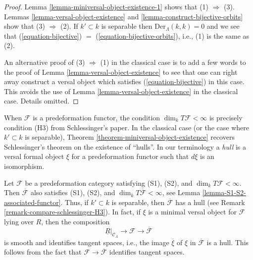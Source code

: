 \begin{proof}
Lemma \ref{lemma-miniversal-object-existence-1}
shows that (1) $\Rightarrow$ (3).
Lemmas \ref{lemma-versal-object-existence} and
\ref{lemma-construct-bijective-orbits}
show that (3) $\Rightarrow$ (2). If $k' \subset k$ is separable
then $\text{Der}_\Lambda(k, k) = 0$ and we see that
(\ref{equation-bijective}) $=$ (\ref{equation-bijective-orbits}), i.e.,
(1) is the same as (2).

\medskip\noindent
An alternative proof of (3) $\Rightarrow$ (1) in the classical case
is to add a few words to the proof of
Lemma \ref{lemma-versal-object-existence}
to see that one can right away construct a versal object which
satisfies (\ref{equation-bijective}) in this case. This avoids the use of
Lemma \ref{lemma-versal-object-existence}
in the classical case. Details omitted.
\end{proof}

\begin{remark}
\label{remark-compare-schlessinger-H3}
When $\mathcal{F}$ is a predeformation functor, the condition
$\dim_k T\mathcal{F} < \infty$ is precisely condition (H3) from
Schlessinger's paper. In the classical case (or the case where
$k' \subset k$ is separable),
Theorem \ref{theorem-miniversal-object-existence}
recovers Schlessinger's theorem on the existence of ``hulls''.
In our terminology a {\it hull} is a versal formal object $\xi$ for a
predeformation functor such that $d\xi$ is an isomorphism.
\end{remark}

\begin{remark}
\label{remark-compose-minimal-into-iso-classes}
Let $\mathcal{F}$ be a predeformation category satisfying
(S1), (S2), and $\dim_k T\mathcal{F} < \infty$.
Then $\overline{\mathcal{F}}$ also satisfies
(S1), (S2), and $\dim_k T\overline{\mathcal{F}} < \infty$, see
Lemma \ref{lemma-S1-S2-associated-functor}.
Thus, if $k' \subset k$ is separable, then $\overline{\mathcal{F}}$
has a hull (see Remark \ref{remark-compare-schlessinger-H3}).
In fact, if $\xi$ is a minimal versal object for $\mathcal{F}$
lying over $R$, then the composition
$$
\underline{R}|_{\mathcal{C}_\Lambda} \longrightarrow
\mathcal{F} \longrightarrow \overline{\mathcal{F}}
$$
is smooth and identifies tangent spaces, i.e., the image $\overline{\xi}$
of $\xi$ in $\overline{\mathcal{F}}$ is a hull. This follows from the fact that
$\mathcal{F} \to \overline{\mathcal{F}}$ identifies tangent spaces.
\end{remark}










